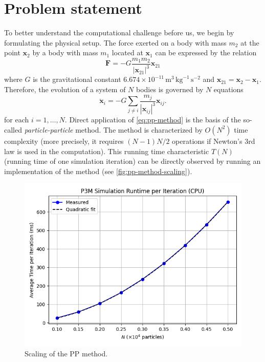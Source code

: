 \section{Problem statement}
To better understand the computational challenge before us, we begin by formulating the physical setup.
The force exerted on a body with mass $m_2$ at the point $\mathbf{x}_2$ by a body with mass $m_1$ located at $\mathbf{x}_1$ can be expressed by the relation
\begin{equation}\label{eq:law-of-uni-grav}
    \mathbf{F} = -G\frac{m_1m_2}{|\mathbf{x}_{21}|^3}\mathbf{x}_{21}
\end{equation}
where $G$ is the gravitational constant $6.674\times 10^{-11}\, \mathrm{m}^3 \,\mathrm{kg}^{-1}\,\mathrm{s}^{-2}$ and $\mathbf{x}_{21} = \mathbf{x}_2 - \mathbf{x}_1$.
Therefore, the evolution of a system of $N$ bodies is governed by $N$ equations
\begin{equation}\label{eq:pp-method}
    \ddot{\mathbf{x}}_i = -G\sum_{j\neq i} \frac{m_j}{|\mathbf{x}_{ij}|^3}\mathbf{x}_{ij}.
\end{equation}
for each $i = 1,\dots, N$.
Direct application of \autoref{eq:pp-method} is the basis of the so-called \textit{particle-particle} method.
The method is characterized by $O(N^2)$ time complexity (more precisely, it requires $(N-1)N/2$ operations if Newton's 3rd law is used in the computation).
This running time characteristic $T(N)$ (running time of one simulation iteration) can be directly observed by running an implementation of the method (see \autoref{fig:pp-method-scaling}).
\begin{figure}[htp]
    \centering
    \includegraphics[scale=0.5]{chapters/introduction/img/pp_time.png}
    \caption{Scaling of the PP method.}
    \label{fig:pp-method-scaling}
\end{figure}
